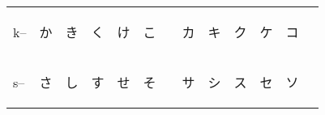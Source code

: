 \begin{table}[H]
\begin{tabular}{l|cccccc|cccccc}
		   k-- & {\begin{CJK}{UTF8}{min} か \end{CJK}} & {\begin{CJK}{UTF8}{min} き \end{CJK}} & {\begin{CJK}{UTF8}{min} く \end{CJK}} & {\begin{CJK}{UTF8}{min} け \end{CJK}} & {\begin{CJK}{UTF8}{min} こ \end{CJK}} &                                       & {\begin{CJK}{UTF8}{min} カ \end{CJK}} & {\begin{CJK}{UTF8}{min} キ \end{CJK}} & {\begin{CJK}{UTF8}{min} ク \end{CJK}} & {\begin{CJK}{UTF8}{min} ケ \end{CJK}} & {\begin{CJK}{UTF8}{min} コ \end{CJK}} &                                      \\
           s-- & {\begin{CJK}{UTF8}{min} さ \end{CJK}} & {\begin{CJK}{UTF8}{min} し \end{CJK}} & {\begin{CJK}{UTF8}{min} す \end{CJK}} & {\begin{CJK}{UTF8}{min} せ \end{CJK}} & {\begin{CJK}{UTF8}{min} そ \end{CJK}} &                                       & {\begin{CJK}{UTF8}{min} サ \end{CJK}} & {\begin{CJK}{UTF8}{min} シ \end{CJK}} & {\begin{CJK}{UTF8}{min} ス \end{CJK}} & {\begin{CJK}{UTF8}{min} セ \end{CJK}} & {\begin{CJK}{UTF8}{min} ソ \end{CJK}} &                                      \\

\end{tabular}
\end{table}
